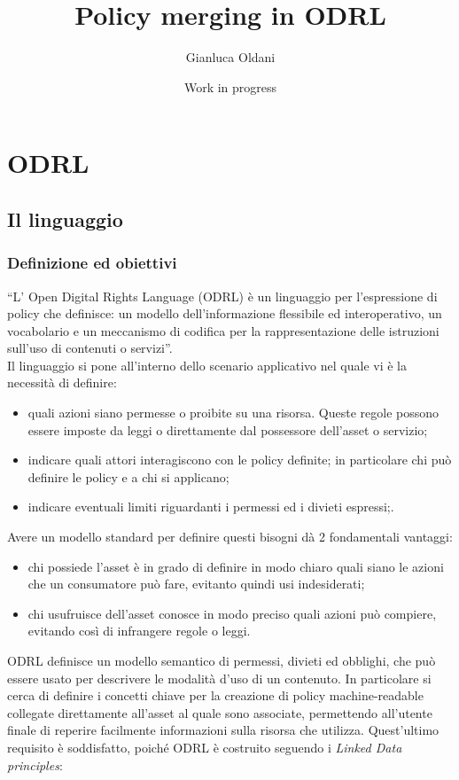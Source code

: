 \documentclass[12pt,a4paper,twoside]{book}
\title{Policy merging in ODRL}
\date{Work in progress}
\author{Gianluca Oldani}
\begin{document}
\maketitle
\tableofcontents
\chapter{ODRL}\label{ODRLChapter}
\section{Il linguaggio}
\subsection{Definizione ed obiettivi}
``L' Open Digital Rights Language (ODRL) è un linguaggio per l'espressione di policy che definisce: un modello dell'informazione flessibile ed interoperativo, un vocabolario e un meccanismo di codifica per la rappresentazione delle istruzioni sull'uso di contenuti o servizi''\cite{ODRLinfMod}.\\
Il linguaggio si pone all'interno dello scenario applicativo nel quale vi è la necessità di definire:
\begin{itemize}
	\item quali azioni siano permesse o proibite su una risorsa. Queste regole possono essere imposte da leggi o direttamente dal possessore dell'asset o servizio;
	\item indicare quali attori interagiscono con le policy definite; in particolare chi può definire le policy e a chi si applicano;
	\item indicare eventuali limiti riguardanti i permessi ed i divieti espressi;.
\end{itemize}
Avere un modello standard per definire questi bisogni dà 2 fondamentali vantaggi:
\begin{itemize}
	\item chi possiede l'asset è in grado di definire in modo chiaro quali siano le azioni che un consumatore può fare, evitanto quindi usi indesiderati;
	\item chi usufruisce dell'asset conosce in modo preciso quali azioni può compiere, evitando così di infrangere regole o leggi.
\end{itemize}
ODRL definisce un modello semantico di permessi, divieti ed obblighi, che può essere usato per descrivere le modalità d'uso di un contenuto. In particolare si cerca di definire i concetti chiave per la creazione di policy machine-readable collegate direttamente all'asset al quale sono associate, permettendo all'utente finale di reperire facilmente informazioni sulla risorsa che utilizza. Quest'ultimo requisito è soddisfatto, poiché ODRL è costruito seguendo i \textit{Linked Data principles}\cite{LinkedDataInfo}:
\end{document}
